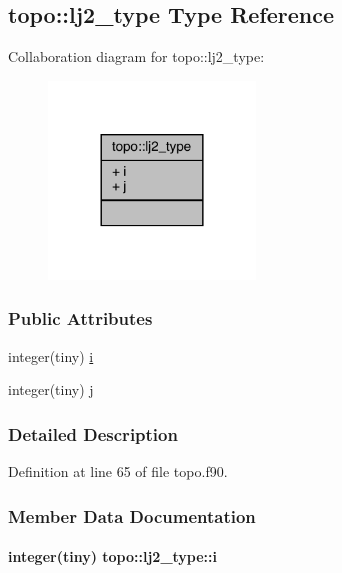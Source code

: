 \hypertarget{structtopo_1_1lj2__type}{\subsection{topo\-:\-:lj2\-\_\-type Type Reference}
\label{structtopo_1_1lj2__type}
}


Collaboration diagram for topo\-:\-:lj2\-\_\-type\-:
\nopagebreak
\begin{figure}[H]
\begin{center}
\leavevmode
\includegraphics[width=156pt]{structtopo_1_1lj2__type__coll__graph}
\end{center}
\end{figure}
\subsubsection*{Public Attributes}
\begin{DoxyCompactItemize}
\item 
integer(tiny) \hyperlink{structtopo_1_1lj2__type_a8f71521d6da59b6ad81d27414d8b5fc4}{i}
\item 
integer(tiny) \hyperlink{structtopo_1_1lj2__type_ac35b83bc7424b44e537b844e8d7f42ba}{j}
\end{DoxyCompactItemize}


\subsubsection{Detailed Description}


Definition at line 65 of file topo.\-f90.



\subsubsection{Member Data Documentation}
\hypertarget{structtopo_1_1lj2__type_a8f71521d6da59b6ad81d27414d8b5fc4}{
\paragraph[{i}]{\setlength{\rightskip}{0pt plus 5cm}integer(tiny) topo\-::lj2\-\_\-type\-::i}}\label{structtopo_1_1lj2__type_a8f71521d6da59b6ad81d27414d8b5fc4}


